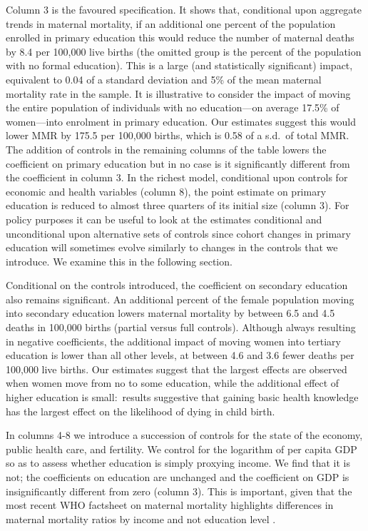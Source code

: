 \documentclass{article}[12pt,subeqn]
\begin{document}
\begin{spacing}{1.4}
Column 3 is the favoured specification. It shows that, conditional upon 
aggregate trends in maternal mortality, if an additional one percent of the 
population enrolled in primary education this would reduce the number of maternal 
deaths by 8.4 per 100,000 live births (the omitted group is the percent of the
population with no formal education).  This is a large (and statistically
significant) impact, equivalent to 0.04 of a standard deviation and 5\% of the
mean maternal mortality rate in the sample. It is illustrative to consider the
impact of moving the entire population of individuals with no education---on
average 17.5\% of women---into enrolment in primary education. Our estimates
suggest this would lower MMR by 175.5 per 100,000 births, which is 0.58 of a
s.d.\ of total MMR. The addition of controls in the remaining columns of the
table lowers the coefficient on primary education but in no case is it
significantly different from the coefficient in column 3. In the richest model,
conditional upon controls for economic and health variables (column 8), the
point estimate on primary education is reduced to almost three quarters of its 
initial size (column 3). For policy purposes it can be useful to look at the 
estimates conditional and unconditional upon alternative sets of controls since 
cohort changes in primary education will sometimes evolve similarly to changes in 
the controls that we introduce. We examine this in the following section.

Conditional on the controls introduced, the coefficient on secondary education
also remains significant. An additional percent of the female population moving
into secondary education lowers maternal mortality by between 6.5 and 4.5 deaths
in 100,000 births (partial versus full controls).  Although always resulting
in negative coefficients, the additional impact of moving women into tertiary
education is lower than all other levels, at between 4.6 and 3.6 fewer deaths per
100,000 live births.  Our estimates suggest that the largest effects are observed
when women move from no to some education, while
the additional effect of higher education is small:\ results suggestive that
gaining basic health knowledge has the largest effect on the likelihood of dying
in child birth.

In columns 4-8 we introduce a succession of controls for the state of the
economy, public health care, and fertility. We control for the logarithm of per 
capita GDP so as to assess whether education is simply proxying income. We find 
that it is not; the coefficients on education are unchanged and the coefficient 
on GDP is insignificantly different from zero (column 3). This is important, 
given that the most recent WHO factsheet on maternal mortality highlights 
differences in maternal mortality ratios by income and not education level
\citep{WHO2012}.


\end{spacing}
\end{document}
